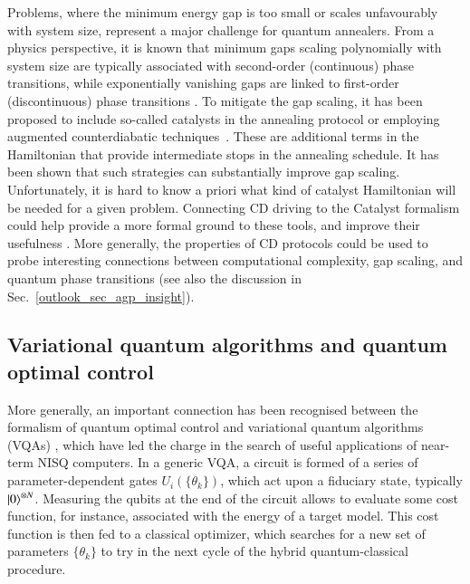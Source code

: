 Problems, where the minimum energy gap is too small or scales unfavourably with system size, represent a major challenge for quantum annealers. From a physics perspective, it is known that minimum gaps scaling polynomially with system size are typically associated with second-order (continuous) phase transitions, while exponentially vanishing gaps are linked to first-order (discontinuous) phase transitions \cite{jorg2010}. To mitigate the gap scaling, it has been proposed to include so-called catalysts in the annealing protocol \cite{ghosh2024} or employing augmented counterdiabatic techniques~\cite{Balducci1}. These are additional terms in the Hamiltonian that provide intermediate stops in the annealing schedule. It has been shown that such strategies can substantially improve gap scaling. Unfortunately, it is hard to know a priori what kind of catalyst Hamiltonian will be needed for a given problem. Connecting CD driving to the Catalyst formalism could help provide a more formal ground to these tools, and improve their usefulness \cite{prielinger2021}. More generally, the properties of CD protocols could be used to probe interesting connections between computational complexity, gap scaling, and quantum phase transitions (see also the discussion in Sec.~\ref{outlook_sec_agp_insight}).

\subsection{Variational quantum algorithms and quantum optimal control}

More generally, an important connection has been recognised between the formalism of quantum optimal control and variational quantum algorithms (VQAs) \cite{cerezo2021}, which have led the charge in the search of useful applications of near-term NISQ computers. In a generic VQA, a circuit is formed of a series of parameter-dependent gates $U_i(\{\theta_k\})$, which act upon a fiduciary state, typically $\ket{0}^{\otimes N}$. Measuring the qubits at the end of the circuit allows  to evaluate some cost function, for instance, associated with the energy of a target model. This cost function is then fed to a classical optimizer, which searches for a new set of parameters $\{\theta_k\}$ to try in the next cycle of the hybrid quantum-classical procedure.

